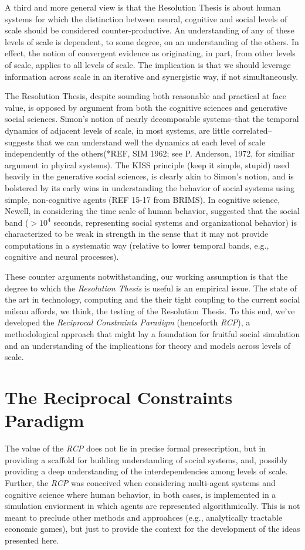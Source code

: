 \documentclass{article}
\begin{document}
A third and more general view is that the Resolution Thesis is about human systems for which the distinction between neural, cognitive and social levels of scale should be considered counter-productive.  An understanding of any of these levels of scale is dependent, to some degree, on an understanding of the others.  In effect, the notion of convergent evidence as originating, in part, from other levels of scale, applies to all levels of scale.  The implication is that we should leverage information across scale in an iterative and synergistic way, if not simultaneously. 

The Resolution Thesis, despite sounding both reasonable and practical at face value, is opposed by argument from both the cognitive sciences and generative social sciences.  Simon's notion of nearly decomposable systems--that the temporal dynamics of adjacent levels of scale, in most systems, are little correlated--suggests that we can understand well the dynamics at each level of scale independently of the others(*REF, SIM 1962; see P. Anderson, 1972, for similiar argument in phyical systems).  The KISS principle (keep it simple, stupid) used heavily in the generative social sciences, is clearly akin to Simon's notion, and is bolstered by its early wins in understanding the behavior of social systems using simple, non-cognitive agents (REF 15-17 from BRIMS).  In cognitive science, Newell, in considering the time scale of human behavior, suggested that the social band ($> 10^4$ seconds, representing social systems and organizational behavior) is characterized to be weak in strength in the sense that it may not provide computations in a systematic way (relative to lower temporal bands, e.g., cognitive and neural processes).  

These counter arguments notwithstanding, our working assumption is that the degree to which the  \textit{Resolution Thesis} is useful is an empirical issue.  The state of the art in technology, computing and the their tight coupling to the current social mileau affords, we think, the testing of the Resolution Thesis.   To this end, we've developed the \textit{Reciprocal Constraints Paradigm} (henceforth \textit{RCP}), a methodological approach that might lay a foundation for fruitful social simulation and an understanding of the implications for theory and models across levels of scale.


\section{The Reciprocal Constraints Paradigm}
The value of the \textit{RCP} does not lie in precise formal presecription, but in providing a scaffold for building understanding of social systems, and, possibly providing a deep understanding of the interdependencies among levels of scale.  Further, the \textit{RCP} was conceived when considering multi-agent systems and cognitive science where human behavior, in both cases, is implemented in a simulation enviorment in which agents are represented algorithmically.  This is not meant to preclude other methods and approahces (e.g., analytically tractable economic games), but just to provide the context for the development of the ideas presented here.
\end{document}
